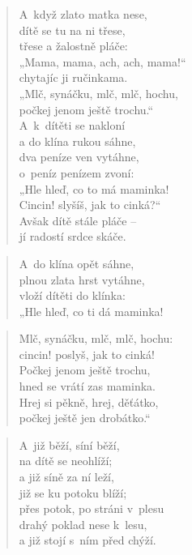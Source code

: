 \begin{verse}
A~když zlato matka nese, \\
dítě se tu na ni třese, \\
třese a žalostně pláče: \\
„Mama, mama, ach, ach, mama!“ \\
chytajíc ji ručinkama. \\
„Mlč, synáčku, mlč, mlč, hochu, \\
počkej jenom ještě trochu.“ \\
A~k~dítěti se nakloní \\
a do klína rukou sáhne, \\
dva peníze ven vytáhne, \\
o~peníz penízem zvoní: \\
„Hle hleď, co to má maminka! \\
Cincin! slyšíš, jak to cinká?“ \\
Avšak dítě stále pláče -- \\
jí radostí srdce skáče.
\end{verse}

\begin{verse}
A~do klína opět sáhne, \\
plnou zlata hrst vytáhne, \\
vloží dítěti do klínka: \\
„Hle hleď, co ti dá maminka!
\end{verse}

\begin{verse}
Mlč, synáčku, mlč, mlč, hochu: \\
cincin! poslyš, jak to cinká! \\
Počkej jenom ještě trochu, \\
hned se vrátí zas maminka. \\
Hrej si pěkně, hrej, děťátko, \\
počkej ještě jen drobátko.“
\end{verse}

\begin{verse}
A~již běží, síní běží, \\
na dítě se neohlíží; \\
a již síně za ní leží, \\
již se ku potoku blíží; \\
přes potok, po stráni v~plesu \\
drahý poklad nese k~lesu, \\
a již stojí s~ním před chýží.
\end{verse}

